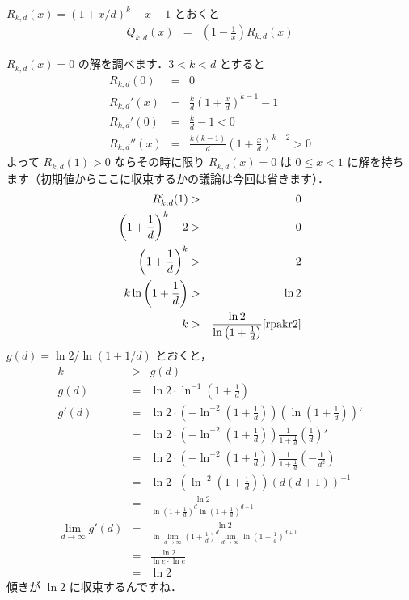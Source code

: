 \documentclass[a4j, 12pt]{jsarticle}
\renewcommand{\liminf}{\lim_{d\rightarrow\infty}}
\newcommand{\Q}{Q_{k,d}(x)}
\newcommand{\R}{R_{k,d}(x)}
\begin{document}
$\R = (1+x/d)^k-x-1$ とおくと
\begin{eqnarray}
  \Q&=&\left(1-\frac{1}{x}\right) \R
\end{eqnarray}

$\R=0$ の解を調べます．$3<k<d$ とすると
\begin{eqnarray}
  R_{k,d}(0)&=&0\\
  R_{k,d}' (x) &=& \frac{k}{d}\left(1+\frac{x}{d}\right)^{k-1}-1\\
  R_{k,d}' (0) &=& \frac{k}{d}-1 < 0\\
  R_{k,d}''(x) &=& \frac{k(k-1)}{d}\left(1+\frac{x}{d}\right)^{k-2}>0
\end{eqnarray}
よって $R_{k,d}(1)>0$ ならその時に限り $\R=0$ は $0 \leq x < 1$ に解を持ちます（初期値からここに収束するかの議論は今回は省きます）．
\begin{eqnarray}
  R_{k,d}'(1)&>&0\\
  \left(1+\frac{1}{d}\right)^k-2&>&0\\
  \left(1+\frac{1}{d}\right)^k&>&2\\
  k\ln\left(1+\frac{1}{d}\right)&>&\ln 2\\
  k&>&\frac{\ln 2}{\ln\left(1+\frac{1}{d}\right)} \cite{rpakr2}
\end{eqnarray}
$g(d)=\ln2/\ln(1+1/d)$ とおくと，
\begin{eqnarray}
  k&>&g(d)\\
  g(d) &=&\ln 2\cdot\ln^{-1}\left(1+\frac{1}{d}\right)\\
  g'(d)&=&\ln 2\cdot\left(-\ln^{-2}\left(1+\frac{1}{d}\right)\right)\left(\ln\left(1+\frac{1}{d}\right)\right)'\\
       &=&\ln 2\cdot\left(-\ln^{-2}\left(1+\frac{1}{d}\right)\right)\frac{1}{1+\frac{1}{d}}\left(\frac{1}{d}\right)'\\
       &=&\ln 2\cdot\left(-\ln^{-2}\left(1+\frac{1}{d}\right)\right)\frac{1}{1+\frac{1}{d}}\left(-\frac{1}{d^2}\right)\\
       &=&\ln 2\cdot\left( \ln^{-2}\left(1+\frac{1}{d}\right)\right)\left(d(d+1)\right)^{-1}\\
               &=&\frac{\ln 2}{        \ln\left(1+\frac{1}{d}\right)^d       \ln\left(1+\frac{1}{d}\right)^{d+1}}\\
  \liminf g'(d)&=&\frac{\ln 2}{\ln\liminf \left(1+\frac{1}{d}\right)^d\liminf\ln\left(1+\frac{1}{d}\right)^{d+1}}\\
               &=&\frac{\ln 2}{\ln e\cdot\ln e}\\
               &=&      \ln 2
\end{eqnarray}
傾きが $\ln 2$ に収束するんですね．
\end{document}
